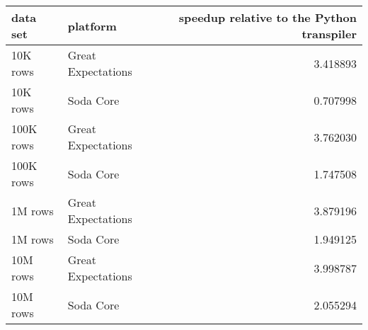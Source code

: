 \begin{tabular}{llr}
\toprule
data set & platform & speedup relative to the Python transpiler \\
\midrule
10K rows & Great Expectations & 3.418893 \\
10K rows & Soda Core & 0.707998 \\
100K rows & Great Expectations & 3.762030 \\
100K rows & Soda Core & 1.747508 \\
1M rows & Great Expectations & 3.879196 \\
1M rows & Soda Core & 1.949125 \\
10M rows & Great Expectations & 3.998787 \\
10M rows & Soda Core & 2.055294 \\
\bottomrule
\end{tabular}
